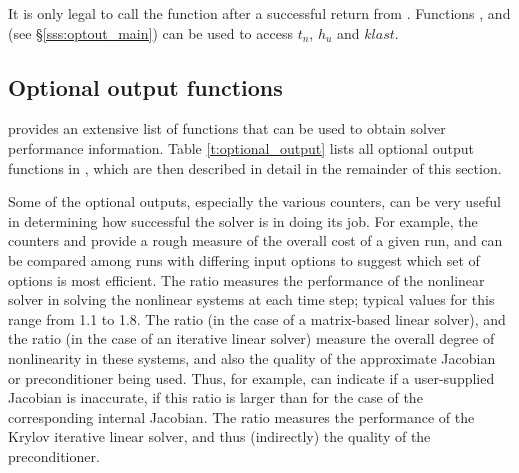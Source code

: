 {{}
{
  It is only legal to call the function  after a
  successful return from . Functions ,
   and  (see \S\ref{sss:optout_main})
  can be used to access $t_n$, $h_u$ and $klast$.
}

\subsection{Optional output functions}\label{ss:optional_output}

{\ida} provides an extensive list of functions that can be used to obtain
solver performance information.  Table \ref{t:optional_output} lists all optional
output functions in {\ida}, which are then described in detail in the remainder
of this section.

Some of the optional outputs, especially the various counters, can be
very useful in determining how successful the {\ida} solver is in
doing its job.  For example, the counters  and 
provide a rough measure of the overall cost of a given run, and can be
compared among runs with differing input options to suggest which set
of options is most efficient.  The ratio  measures
the performance of the nonlinear solver in solving the nonlinear
systems at each time step; typical values for this range from 1.1 to
1.8.  The ratio  (in the case of a matrix-based linear
solver), and the ratio  (in the case of an
iterative linear solver) measure the overall degree of nonlinearity
in these systems, and also the quality of the approximate Jacobian or
preconditioner being used.  Thus, for example, 
can indicate if a user-supplied Jacobian is inaccurate, if this ratio
is larger than for the case of the corresponding internal Jacobian.
The ratio  measures the performance of the Krylov
iterative linear solver, and thus (indirectly) the quality of the
preconditioner.

\vspace*{.2in}

\newlength{\colAA}
\settowidth{\colAA}{No. of residual calls for finite diff. Jacobian[-vector] evals.}
\newlength{\colBB}

}
